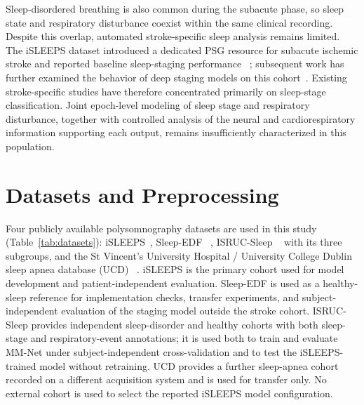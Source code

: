 \documentclass{ieeeaccess}
\begin{document}
Sleep-disordered breathing is also common during the subacute phase, so sleep
state and respiratory disturbance coexist within the same clinical recording.
Despite this overlap, automated stroke-specific sleep analysis remains limited.
The iSLEEPS dataset introduced a dedicated PSG resource for subacute ischemic
stroke and reported baseline sleep-staging performance
~\cite{maiti2026isleeps}; subsequent work has further examined the behavior of
deep staging models on this cohort~\cite{bose2026gap}. Existing stroke-specific
studies have therefore concentrated primarily on sleep-stage classification.
Joint epoch-level modeling of sleep stage and respiratory disturbance, together
with controlled analysis of the neural and cardiorespiratory information
supporting each output, remains insufficiently characterized in this
population.

\section{Datasets and Preprocessing}
\label{sec:data}

Four publicly available polysomnography datasets are used in this study (Table~\ref{tab:datasets}):
iSLEEPS~\cite{maiti2026isleeps}, Sleep-EDF
~\cite{kemp2000sleepedf,goldberger2000physionet}, ISRUC-Sleep
~\cite{khalighi2016isruc} with its three subgroups, and the St Vincent's
University Hospital / University College Dublin sleep apnea database (UCD)
~\cite{ucddb2007}. iSLEEPS is the primary cohort used for model development and
patient-independent evaluation. Sleep-EDF is used as a healthy-sleep reference
for implementation checks, transfer experiments, and subject-independent
evaluation of the staging model outside the stroke cohort. ISRUC-Sleep provides
independent sleep-disorder and healthy cohorts with both sleep-stage and
respiratory-event annotations; it is used both to train and evaluate MM-Net
under subject-independent cross-validation and to test the iSLEEPS-trained model
without retraining. UCD provides a further sleep-apnea cohort recorded on a
different acquisition system and is used for transfer only. No external cohort is
used to select the reported iSLEEPS model configuration.
\end{document}
